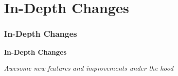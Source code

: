 %

\section{In-Depth Changes}
\begin{frame}[fragile]
	\frametitle{In-Depth Changes}

	\begin{center}\huge{\color{typo3darkgrey}\textbf{In-Depth Changes}}\end{center}
	\begin{center}\large{\textit{Awesome new features and improvements under the hood}}\end{center}

\end{frame}

